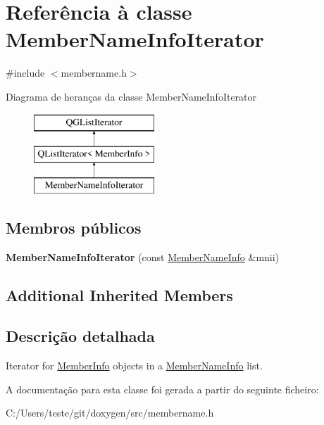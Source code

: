\hypertarget{class_member_name_info_iterator}{\section{Referência à classe Member\-Name\-Info\-Iterator}
\label{class_member_name_info_iterator}
}


{\ttfamily \#include $<$membername.\-h$>$}

Diagrama de heranças da classe Member\-Name\-Info\-Iterator\begin{figure}[H]
\begin{center}
\leavevmode
\includegraphics[height=3.000000cm]{class_member_name_info_iterator}
\end{center}
\end{figure}
\subsection*{Membros públicos}
\begin{DoxyCompactItemize}
\item 
\hypertarget{class_member_name_info_iterator_a268eced4cde4d144c1e482f7610fc997}{{\bfseries Member\-Name\-Info\-Iterator} (const \hyperlink{class_member_name_info}{Member\-Name\-Info} \&mnii)}\label{class_member_name_info_iterator_a268eced4cde4d144c1e482f7610fc997}

\end{DoxyCompactItemize}
\subsection*{Additional Inherited Members}


\subsection{Descrição detalhada}
Iterator for \hyperlink{struct_member_info}{Member\-Info} objects in a \hyperlink{class_member_name_info}{Member\-Name\-Info} list. 

A documentação para esta classe foi gerada a partir do seguinte ficheiro\-:\begin{DoxyCompactItemize}
\item 
C\-:/\-Users/teste/git/doxygen/src/membername.\-h\end{DoxyCompactItemize}
